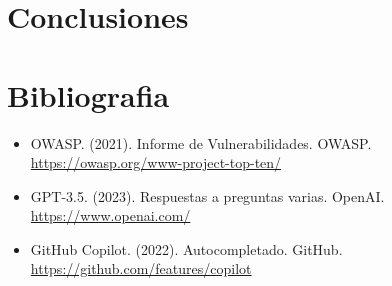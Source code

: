 \documentclass{report}
\begin{document}
    \chapter{Conclusiones}
    \chapter{Bibliografia}
        \begin{itemize}
            \item OWASP. (2021). Informe de Vulnerabilidades. OWASP. \url{https://owasp.org/www-project-top-ten/}
            \item GPT-3.5. (2023). Respuestas a preguntas varias. OpenAI. \url{https://www.openai.com/}
            \item GitHub Copilot. (2022). Autocompletado. GitHub. \url{https://github.com/features/copilot}
        \end{itemize}
\end{document}
